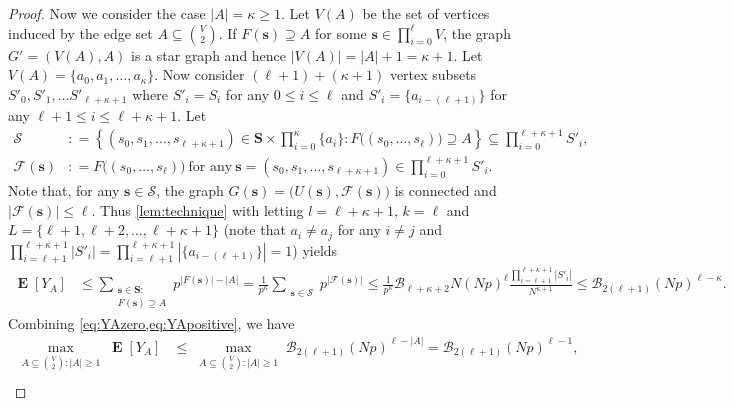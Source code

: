 \documentclass[letterpaper,11pt]{article}
\newcommand{\Vsize}{N}
\newcommand{\pmax}{p}
\newcommand{\Slc}{\mathbf{S}}
\newcommand{\Vs}{U}
\newcommand{\Es}{F}
\DeclareMathOperator{\E}{\mathbf{E}}
\def\defeq{\mathrel{\mathop:}=}%
\begin{document}
\begin{proof}
Now we consider the case $|A|=\kappa\geq 1$.
Let $V(A)$ be the set of vertices induced by the edge set $A\subseteq \binom{V}{2}$.
If $\Es(\mathbf{s})\supseteq A$ for some $\mathbf{s}\in \prod_{i=0}^\ell V$, the graph 
$G'=(V(A),A)$ is a star graph and hence $|V(A)|=|A|+1=\kappa+1$.
Let $V(A)=\{a_0, a_1, \ldots, a_{\kappa}\}$.
Now consider $(\ell+1)+(\kappa+1)$ vertex subsets $S'_0, S'_1, \ldots S'_{\ell+\kappa+1}$ where $S'_i=S_i$ for any $0\leq i\leq \ell$ and $S'_i=\{a_{i-(\ell+1)}\}$ for any $\ell+1\leq i\leq \ell+\kappa+1$.
Let
\begin{align*}
\mathcal{S}&\defeq \left\{ (s_0, s_1, \ldots, s_{\ell+\kappa+1})\in \Slc\times \prod_{i=0}^{\kappa}\{a_i\}: F\bigl( (s_0,\ldots,s_\ell)\bigr)\supseteq A \right\}\subseteq \prod_{i=0}^{\ell+\kappa+1}S'_i,\\
\mathcal{F}(\mathbf{s})&\defeq F\bigl((s_0,\ldots,s_\ell)\bigr) \ \textrm{for any}\ \mathbf{s}=(s_0, s_1, \ldots, s_{\ell+\kappa+1})\in \prod_{i=0}^{\ell+\kappa+1}S'_i.
\end{align*}
Note that, for any $\mathbf{s}\in \mathcal{S}$, 
the graph $G({\mathbf{s}})=\bigl(\Vs({\mathbf{s}}), \mathcal{F}(\mathbf{s})\bigr)$ is connected and $|\mathcal{F}(\mathbf{s})|\leq \ell$.
Thus \cref{lem:technique} 
with letting $l=\ell+\kappa+1$, $k=\ell$ and $L=\{\ell+1, \ell+2, \ldots, \ell+\kappa+1\}$ (note that $a_i\neq a_j$ for any $i\neq j$ and $\prod_{i=\ell+1}^{\ell+\kappa+1}|S'_i|=\prod_{i=\ell+1}^{\ell+\kappa+1}|\{a_{i-(\ell+1)}\}|=1$)
yields
\begin{align}
\E[Y_{A}]
&\leq 
\sum_{\substack{\mathbf{s}\in \Slc:\\ \Es(\mathbf{s}) \supseteq A}}p^{|\Es(\mathbf{s})|-|A|}
=\frac{1}{p^{\kappa}}\sum_{\substack{\mathbf{s}\in \mathcal{S}}}p^{|\mathcal{F}(\mathbf{s})|}
\leq \frac{1}{p^{\kappa}} \mathcal{B}_{\ell+\kappa+2} \Vsize(\Vsize\pmax)^{\ell}\frac{\prod_{i=\ell+1}^{\ell+\kappa+1}|S'_i|}{\Vsize^{\kappa+1}}
\leq \mathcal{B}_{2(\ell+1)}(\Vsize \pmax)^{\ell-\kappa}.
\label{eq:YApositive}
\end{align}
%
Combining \cref{eq:YAzero,eq:YApositive}, we have
\begin{align*}
\max_{\substack{A\subseteq \binom{V}{ 2}:|A|\geq 1}}\E[Y_{A}]
&\leq \max_{\substack{A\subseteq \binom{V}{2}:|A|\geq 1}}\mathcal{B}_{2(\ell+1)}(\Vsize\pmax)^{\ell-|A|}=\mathcal{B}_{2(\ell+1)}(\Vsize \pmax)^{\ell-1}, \\

\end{align*}
\end{proof}
\end{document}
